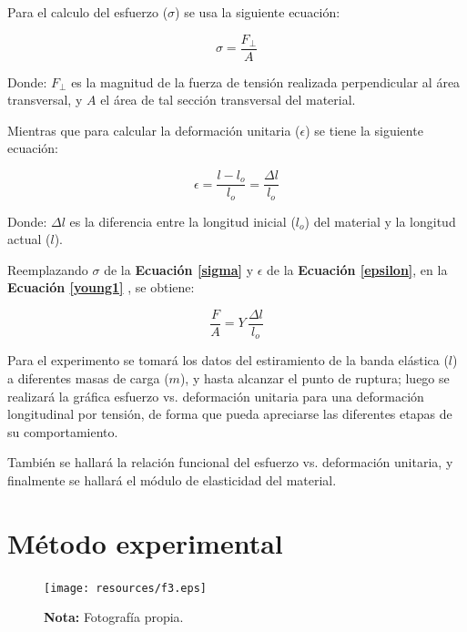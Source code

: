 \documentclass[letter,11pt]{article}
\newcommand{\source}[1]{\vspace{-11pt} \caption*{\small{\textbf{Nota:} {#1}}}}
\begin{document}
Para el calculo del esfuerzo ($\sigma$) se usa la siguiente ecuación:

\begin{equation}
    \sigma = \frac{F_{\perp}}{A}
\label{sigma}
\end{equation}
\vspace{0.10cm}

Donde: $F_{\perp}$ es la magnitud de la fuerza de tensión realizada
perpendicular al área transversal, y $A$ el área de tal sección transversal del
material.

Mientras que para calcular la deformación unitaria ($\epsilon$) se tiene la
siguiente ecuación:

\begin{equation}
    \epsilon = \frac{l - l_o}{l_o} = \frac{\Delta l}{l_o}
\label{epsilon}
\end{equation}
\vspace{0.10cm}

Donde: $\Delta l$ es la diferencia entre la longitud inicial ($l_o$) del
material y la longitud actual ($l$).

Reemplazando $\sigma$ de la \textbf{Ecuación \ref{sigma}} y $\epsilon$ de la
\textbf{Ecuación \ref{epsilon}}, en la \textbf{Ecuación \ref{young1}}
\cite{GUIA}, se obtiene:

\begin{equation}
    \frac{F}{A} = Y\,\frac{\Delta l}{l_o}
\label{young2}
\end{equation}
\vspace{0.10cm}

Para el experimento se tomará los datos del estiramiento de la banda elástica
($l$) a diferentes masas de carga ($m$), y hasta alcanzar el punto de ruptura;
luego se realizará la gráfica esfuerzo vs. deformación unitaria para una
deformación longitudinal por tensión, de forma que pueda apreciarse las
diferentes etapas de su comportamiento.

También se hallará la relación funcional del esfuerzo vs. deformación unitaria,
y finalmente se hallará el módulo de elasticidad del material.

\section{Método experimental}

\begin{figure}
\centering
\texttt{[image: resources/f3.eps]}
\caption{Montaje del experimento.}
\label{figura2}
\source{Fotografía propia.}
\end{figure}
\end{document}
